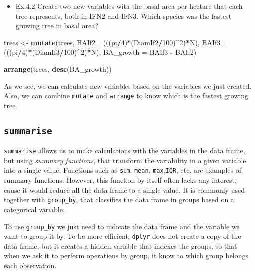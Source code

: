 \documentclass[]{article}
\newenvironment{Shaded}{\begin{snugshade}}{\end{snugshade}}
\newcommand{\KeywordTok}[1]{\textcolor[rgb]{0.13,0.29,0.53}{\textbf{#1}}}
\newcommand{\DataTypeTok}[1]{\textcolor[rgb]{0.13,0.29,0.53}{#1}}
\newcommand{\DecValTok}[1]{\textcolor[rgb]{0.00,0.00,0.81}{#1}}
\newcommand{\StringTok}[1]{\textcolor[rgb]{0.31,0.60,0.02}{#1}}
\newcommand{\OperatorTok}[1]{\textcolor[rgb]{0.81,0.36,0.00}{\textbf{#1}}}
\newcommand{\NormalTok}[1]{#1}
\providecommand{\tightlist}{%
  \setlength{\itemsep}{0pt}\setlength{\parskip}{0pt}}
\begin{document}
\begin{itemize}
\tightlist
\item
  Ex.4.2 Create two new variables with the basal area per hectare that
  each tree represents, both in IFN2 and IFN3. Which species was the
  fastest growing tree in basal area?
\end{itemize}

\begin{Shaded}
\begin{Highlighting}[]
\NormalTok{trees <-}\StringTok{ }\KeywordTok{mutate}\NormalTok{(trees, }\DataTypeTok{BAIf2=}\NormalTok{ (((pi}\OperatorTok{/}\DecValTok{4}\NormalTok{)}\OperatorTok{*}\NormalTok{(DiamIf2}\OperatorTok{/}\DecValTok{100}\NormalTok{)}\OperatorTok{^}\DecValTok{2}\NormalTok{)}\OperatorTok{*}\NormalTok{N),}
                \DataTypeTok{BAIf3=}\NormalTok{ (((pi}\OperatorTok{/}\DecValTok{4}\NormalTok{)}\OperatorTok{*}\NormalTok{(DiamIf3}\OperatorTok{/}\DecValTok{100}\NormalTok{)}\OperatorTok{^}\DecValTok{2}\NormalTok{)}\OperatorTok{*}\NormalTok{N),}
                \DataTypeTok{BA_growth =}\NormalTok{ BAIf3 }\OperatorTok{-}\StringTok{ }\NormalTok{BAIf2)}

\KeywordTok{arrange}\NormalTok{(trees, }\KeywordTok{desc}\NormalTok{(BA_growth))}
\end{Highlighting}
\end{Shaded}

As we see, we can calculate new variables based on the variables we just
created. Also, we can combine \texttt{mutate} and \texttt{arrange} to
know which is the fastest growing tree.

\subsection{\texorpdfstring{\texttt{summarise}}{summarise}}\label{summarise}

\texttt{summarise} allows us to make calculations with the variables in
the data frame, but using \emph{summary functions}, that transform the
variability in a given variable into a single value. Functions such as
\texttt{sum}, \texttt{mean}, \texttt{max},\texttt{IQR}, etc. are
examples of summary functions. However, this function by itself often
lacks any interest, cause it would reduce all the data frame to a single
value. It is commonly used together with \texttt{group\_by}, that
classifies the data frame in groups based on a categorical variable.

To use \texttt{group\_by} we just need to indicate the data frame and
the variable we want to group it by. To be more efficient,
\texttt{dplyr} does not create a copy of the data frame, but it creates
a hidden variable that indexes the groups, so that when we ask it to
perform operations by group, it know to which group belongs each
observation.
\end{document}
